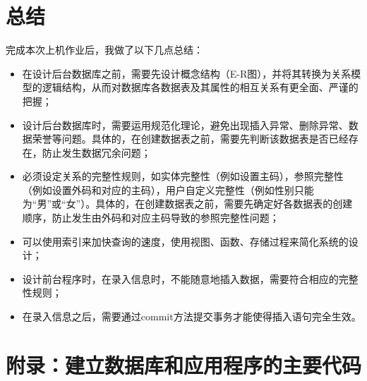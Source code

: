 \documentclass {article}
\begin{document}
	\section{总结}
		完成本次上机作业后，我做了以下几点总结：
		\begin{itemize}
			\item 在设计后台数据库之前，需要先设计概念结构（E-R图），并将其转换为关系模型的逻辑结构，从而对数据库各数据表及其属性的相互关系有更全面、严谨的把握；
			\item 设计后台数据库时，需要运用规范化理论，避免出现插入异常、删除异常、数据荣誉等问题。具体的，在创建数据表之前，需要先判断该数据表是否已经存在，防止发生数据冗余问题；
			\item 必须设定关系的完整性规则，如实体完整性（例如设置主码），参照完整性（例如设置外码和对应的主码），用户自定义完整性（例如性别只能为“男”或“女”）。具体的，在创建数据表之前，需要先确定好各数据表的创建顺序，防止发生由外码和对应主码导致的参照完整性问题；
			\item 可以使用索引来加快查询的速度，使用视图、函数、存储过程来简化系统的设计；
			\item 设计前台程序时，在录入信息时，不能随意地插入数据，需要符合相应的完整性规则；
			\item 在录入信息之后，需要通过commit方法提交事务才能使得插入语句完全生效。
		\end{itemize}
	
	\section{附录：建立数据库和应用程序的主要代码}
\end{document}
